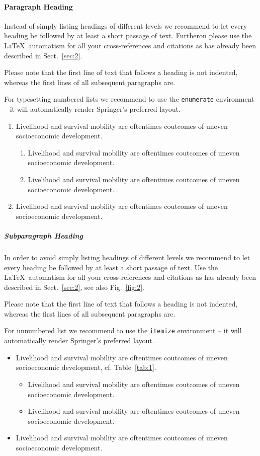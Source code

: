 \documentclass[graybox,envcountchap,sectrefs]{svmono}
\begin{document}
\paragraph{Paragraph Heading} %
Instead of simply listing headings of different levels we recommend to let every heading be followed by at least a short passage of text. Furtheron please use the \LaTeX\ automatism for all your cross-references and citations as has already been described in Sect.~\ref{sec:2}.

Please note that the first line of text that follows a heading is not indented, whereas the first lines of all subsequent paragraphs are.

For typesetting numbered lists we recommend to use the \verb|enumerate| environment -- it will automatically render Springer's preferred layout.

\begin{enumerate}
	\item{Livelihood and survival mobility are oftentimes coutcomes of uneven socioeconomic development.}
	\begin{enumerate}
		\item{Livelihood and survival mobility are oftentimes coutcomes of uneven socioeconomic development.}
		\item{Livelihood and survival mobility are oftentimes coutcomes of uneven socioeconomic development.}
	\end{enumerate}
	\item{Livelihood and survival mobility are oftentimes coutcomes of uneven socioeconomic development.}
\end{enumerate}


\subparagraph{Subparagraph Heading} In order to avoid simply listing headings of different levels we recommend to let every heading be followed by at least a short passage of text. Use the \LaTeX\ automatism for all your cross-references and citations as has already been described in Sect.~\ref{sec:2}, see also Fig.~\ref{fig:2}.

Please note that the first line of text that follows a heading is not indented, whereas the first lines of all subsequent paragraphs are.

For unnumbered list we recommend to use the \verb|itemize| environment -- it will automatically render Springer's preferred layout.

\begin{itemize}
	\item{Livelihood and survival mobility are oftentimes coutcomes of uneven socioeconomic development, cf. Table~\ref{tab:1}.}
	\begin{itemize}
		\item{Livelihood and survival mobility are oftentimes coutcomes of uneven socioeconomic development.}
		\item{Livelihood and survival mobility are oftentimes coutcomes of uneven socioeconomic development.}
	\end{itemize}
	\item{Livelihood and survival mobility are oftentimes coutcomes of uneven socioeconomic development.}
\end{itemize}
\end{document}
